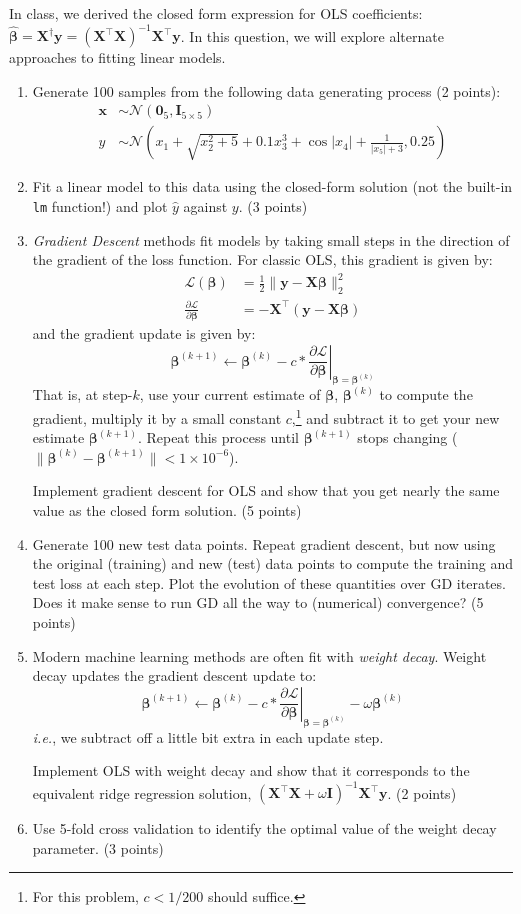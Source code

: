 \documentclass[10pt]{article}
\newcommand{\bzero}{\bm{0}}
\newcommand{\bx}{\bm{x}}
\newcommand{\bI}{\bm{I}}
\newcommand{\bX}{\bm{X}}
\newcommand{\by}{\bm{y}}
\newcommand{\bbeta}{\bm{\beta}}
\begin{document}
In class, we derived the closed form expression for OLS coefficients: $\hat{\bbeta} = \bX^{\dagger}\by = (\bX^{\top}\bX)^{-1}\bX^{\top}\by$. In this question, we will explore alternate approaches to fitting linear models. 

\begin{enumerate}[label={(\alph*)}]
    \item Generate 100 samples from the following data generating process (2 points): 
    \begin{align*}
        \bx &\sim \mathcal{N}(\bzero_5, \bI_{5 \times 5}) \\
        y &\sim \mathcal{N}\left(x_1 + \sqrt{x_2^2 + 5} + 0.1x^3_3 + \cos|x_4| + \frac{1}{|x_5| + 3}, 0.25\right)
    \end{align*}
    \item Fit a linear model to this data using the closed-form solution (not the built-in \texttt{lm} function!) and plot $\hat{y}$ against $y$. (3 points)
    \item \emph{Gradient Descent} methods fit models by taking small steps in the direction of the gradient of the loss function. For classic OLS, this gradient is given by: 
    \begin{align*}
        \mathcal{L}(\bbeta) &= \frac{1}{2}\|\by - \bX\bbeta\|_2^2 \\
        \frac{\partial \mathcal{L}}{\partial \bbeta} &= -\bX^{\top}(\by - \bX\bbeta)
    \end{align*}
    and the gradient update is given by: 
    \[\bbeta^{(k+1)} \leftarrow \bbeta^{(k)} - c * \left.\frac{\partial \mathcal{L}}{\partial \bbeta}\right|_{\bbeta = \bbeta^{(k)}}\]
    That is, at step-$k$, use your current estimate of $\bbeta$, $\bbeta^{(k)}$ to compute the gradient, multiply it by a small constant $c$,\footnote{For this problem, $c < 1/200$ should suffice.} and subtract it to get your new estimate $\bbeta^{(k+1)}$. Repeat this process until $\bbeta^{(k+1)}$ stops changing ($\|\bbeta^{(k)} - \bbeta^{(k+1)}\| < 1\times 10^{-6}$). 

    Implement gradient descent for OLS and show that you get nearly the same value as the closed form solution. (5 points)
    \item Generate 100 new test data points. Repeat gradient descent, but now using the original (training) and new (test) data points to compute the training and test loss at each step. Plot the evolution of these quantities over GD iterates. Does it make sense to run GD all the way to (numerical) convergence? (5 points)
    \item Modern machine learning methods are often fit with \emph{weight decay}. Weight decay updates the gradient descent update to: 
        \[\bbeta^{(k+1)} \leftarrow \bbeta^{(k)} - c * \left.\frac{\partial \mathcal{L}}{\partial \bbeta}\right|_{\bbeta = \bbeta^{(k)}} - \omega \bbeta^{(k)}\]
    \emph{i.e.}, we subtract off a little bit extra in each update step.

    Implement OLS with weight decay and show that it corresponds to the equivalent ridge regression solution, $(\bX^{\top}\bX + \omega \bI)^{-1}\bX^{\top}\by$. (2 points)
    \item Use 5-fold cross validation to identify the optimal value of the weight decay parameter. (3 points)
\end{enumerate}
\end{document}

